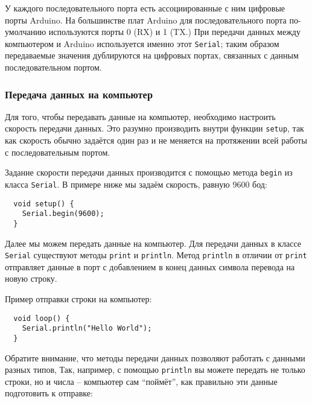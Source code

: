 \documentclass[../sparc.tex]{subfiles}
\begin{document}
У каждого последовательного порта есть ассоциированные с ним цифровые порты
Arduino.  На большинстве плат Arduino для последовательного порта по-умолчанию
используются порты 0 (RX) и 1 (TX.)  При передачи данных между компьютером и
Arduino используется именно этот \texttt{Serial}; таким образом передаваемые
значения дублируются на цифровых портах, связанных с данным последовательном
портом.


\subsubsection{Передача данных на компьютер}

Для того, чтобы передавать данные на компьютер, необходимо настроить скорость
передачи данных.  Это разумно производить внутри функции \texttt{setup}, так как
скорость обычно задаётся один раз и не меняется на протяжении всей работы с
последовательным портом.

Задание скорости передачи данных производится с помощью метода \texttt{begin} из
класса \texttt{Serial}.  В примере ниже мы задаём скорость, равную 9600 бод:

\begin{verbatim}
  void setup() {
    Serial.begin(9600);
  }
\end{verbatim}

Далее мы можем передать данные на компьютер.  Для передачи данных в классе
\texttt{Serial} существуют методы \texttt{print} и \texttt{println}.  Метод
\texttt{println} в отличии от \texttt{print} отправляет данные в порт с
добавлением в конец данных символа перевода на новую строку.

Пример отправки строки на компьютер:

\begin{verbatim}
  void loop() {
    Serial.println("Hello World");
  }
\end{verbatim}

Обратите внимание, что методы передачи данных позволяют работать с данными
разных типов, Так, например, с помощью \texttt{println} вы можете передать не
только строки, но и числа -- компьютер сам ``поймёт'', как правильно эти данные
подготовить к отправке:
\end{document}
